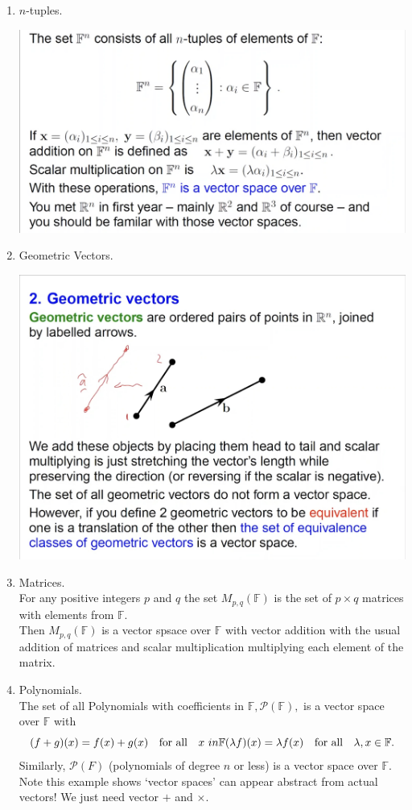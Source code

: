 \documentclass{article}
\begin{document}
\begin{enumerate}
  \item $n$-tuples.\begin{center}
    \includegraphics[scale=0.3]{assets/vector_space_eg.png}\newpage
  \end{center}
  \item Geometric Vectors.\begin{center}
    \includegraphics[scale=0.10]{assets/geometric_vecs.png}
  \end{center}
  \item Matrices.\\For any positive integers $p$ and $q$ the set $M_{p,q}(\mathbb{F})$ is the set of $p \times q$ matrices with elements from $\mathbb{F}$.\\Then $M_{p,q}(\mathbb{F})$ is a vector spsace over $\mathbb{F}$ with vector addition with the usual addition of matrices and scalar multiplication multiplying each element of the matrix.
  \item Polynomials.\\The set of all Polynomials with coefficients in $\mathbb{F}, \mathcal{P}(\mathbb{F}),$ is a vector space over $\mathbb{F}$ with \[(f+g)(x) = f(x) + g(x) \quad \text{for all} \quad x \ in \mathbb{F} \\ (\lambda f)(x) = \lambda f(x) \quad \text{for all} \quad \lambda, x \in \mathbb{F}.\]Similarly, $\mathcal{P}(F)$ (polynomials of degree $n$ or less) is a vector space over $\mathbb{F}$. Note this example shows `vector spaces' can appear abstract from actual vectors! We just need vector $+$ and $\times$.

\end{enumerate}
\end{document}
